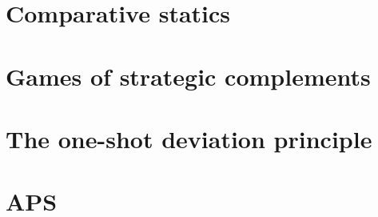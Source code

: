 \documentclass[11pt,letterpaper,reqno,oneside]{book}
\begin{document}
\chapter{Comparative statics}
\label{ch_mcs}





\chapter{Games of strategic complements}
\label{ch_spm}





\chapter{The one-shot deviation principle}
\label{ch_osdp}





\chapter{APS}
\label{ch_aps}









\end{document}
